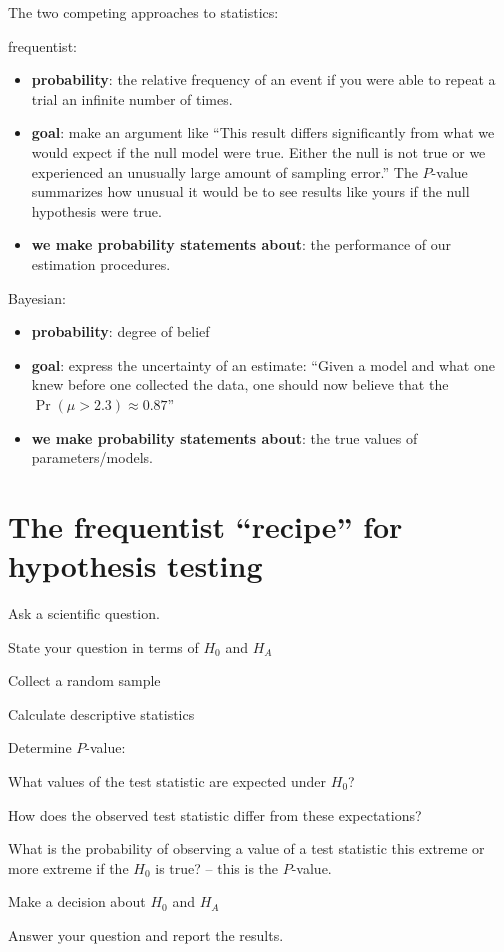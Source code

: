 \documentclass[landscape]{foils}
\begin{document}
\myNewSlide
The two competing approaches to statistics:
\begin{compactitem}
  \item frequentist:
  \begin{itemize}
    \item {\bf probability}: the relative frequency of an event if you were able to repeat a trial an infinite number of times.
    \item {\bf goal}: make an argument like ``This result differs significantly from what we would expect if the null model were true. Either the null is not true or we experienced an unusually large amount of sampling error.''
    The $P$-value summarizes how unusual it would be to see results like yours if the null hypothesis were true.
    \item {\bf we make probability statements about}: the performance of our estimation procedures.
  \end{itemize}
  \item Bayesian:
  \begin{itemize}
    \item {\bf probability}: degree of belief
    \item {\bf goal}: express the uncertainty of an estimate:
    ``Given a model and what one knew before one collected the data, one should now believe that the $\Pr(\mu>2.3)\approx 0.87$''
    \item {\bf we make probability statements about}: the true values of parameters/models.
  \end{itemize}
\end{compactitem}

\myNewSlide
\section*{The frequentist ``recipe'' for hypothesis testing}
\begin{compactenum}
  \item Ask a scientific question.
  \item State your question in terms of $H_0$ and $H_A$
  \item Collect a random sample
  \item Calculate descriptive statistics
  \item Determine $P$-value:
  \begin{compactenum}
    \item What values of the test statistic are expected under $H_0$?
    \item How does the observed test statistic differ from these expectations?
    \item What is the probability of observing a value of a test statistic this extreme or more extreme if the $H_0$ is true? -- this is the $P$-value.
  \end{compactenum}
  \item Make a decision about $H_0$ and $H_A$
  \item Answer your question and report the results.
\end{compactenum}
\end{document}
